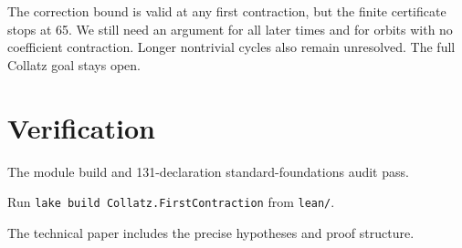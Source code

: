 \documentclass[10pt]{article}
\begin{document}
The correction bound is valid at any first contraction, but the finite
certificate stops at 65. We still need an argument for all later times
and for orbits with no coefficient contraction. Longer nontrivial cycles
also remain unresolved. The full Collatz goal stays open.

\section*{Verification}
The module build and 131-declaration standard-foundations audit pass.
{\raggedright Run \texttt{lake build Collatz.FirstContraction} from \texttt{lean/}.\par}
The technical paper includes the precise hypotheses and proof structure.
\end{document}
